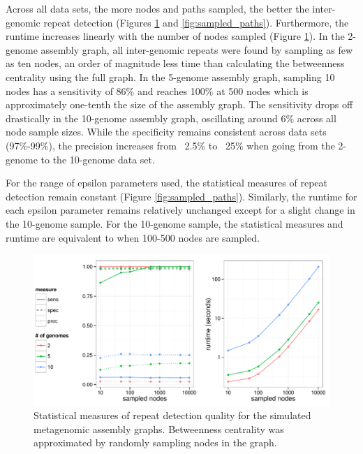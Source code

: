 \documentclass[runningheads,a4paper]{llncs}
\begin{document}
Across all data sets, the more nodes and paths sampled, the better the inter-genomic repeat detection (Figures \ref{fig:sampled_nodes} and \ref{fig:sampled_paths}).
Furthermore, the runtime increases linearly with the number of nodes sampled (Figure \ref{fig:sampled_nodes}).
In the 2-genome assembly graph, all inter-genomic repeats were found by sampling as few as ten nodes, an order of magnitude less time than calculating the betweenness centrality using the full graph.
In the 5-genome assembly graph, sampling 10 nodes has a sensitivity of 86\% and reaches 100\% at 500 nodes which is approximately one-tenth the size of the assembly graph.
The sensitivity drops off drastically in the 10-genome assembly graph, oscillating around 6\% across all node sample sizes.
While the specificity remains consistent across data sets (97\%-99\%), the precision increases from ~2.5\% to ~25\% when going from the 2-genome to the 10-genome data set.

For the range of epsilon parameters used, the statistical measures of repeat detection remain constant (Figure \ref{fig:sampled_paths}).
Similarly, the runtime for each epsilon parameter remains relatively unchanged except for a slight change in the 10-genome sample.
For the 10-genome sample, the statistical measures and runtime are equivalent to when 100-500 nodes are sampled.

\begin{figure}[htbp]
\centering
\includegraphics[width = \textwidth]{sampled_nodes}
\caption{Statistical measures of repeat detection quality for the simulated metagenomic assembly graphs. Betweenness centrality was approximated by randomly sampling nodes in the graph.}
\label{fig:sampled_nodes}
\end{figure}
\end{document}
